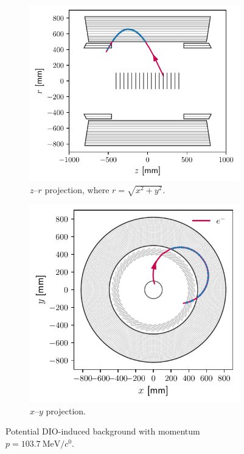\begin{figure}
    \centering
    \begin{subfigure}{0.522\textwidth}
        \centering
        \includegraphics[width=\textwidth]{chapter6/dio_track_zy.pdf}
        \caption{$z$--$r$ projection, where $r = \sqrt{x^2+y^2}$.}
    \end{subfigure}
    \hfill
    \begin{subfigure}{0.467\textwidth}
        \centering
        \includegraphics[width=\textwidth]{chapter6/dio_track_xy.pdf}
        \caption{$x$--$y$ projection.}
    \end{subfigure}
    \caption{ Potential DIO-induced background with momentum
        $p=\SI{103.7}{\MeV/\clight}$.}
    \label{fig:muon_dio_in_cydet}
\end{figure}

